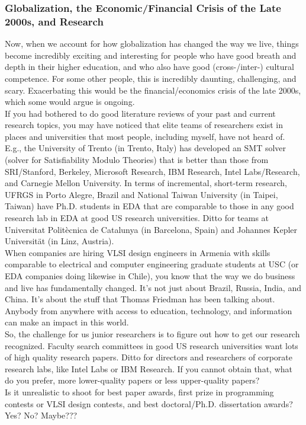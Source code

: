 \subsubsection{\hspace{0.1in} Globalization, the Economic/Financial Crisis of the Late 2000s, and Research}
\label{globalizationfinancialcrisis2008research}

Now, when we account for how globalization has changed the way we live, things become incredibly exciting and interesting for people who have good breath and depth in their higher education, and who also have good (cross-/inter-) cultural competence. For some other people, this is incredibly daunting, challenging, and scary. Exacerbating this would be the financial/economics crisis of the late 2000s, which some would argue is ongoing. \\

If you had bothered to do good literature reviews of your past and current research topics, you may have noticed that elite teams of researchers exist in places and universities that most people, including myself, have not heard of. E.g., the University of Trento (in Trento, Italy) has developed an SMT solver (solver for Satisfiability Modulo Theories) that is better than those from SRI/Stanford, Berkeley, Microsoft Research, IBM Research, Intel Labs/Research, and Carnegie Mellon University. In terms of incremental, short-term research, UFRGS in Porto Alegre, Brazil and National Taiwan University (in Taipei, Taiwan) have Ph.D. students in EDA that are comparable to those in any good research lab in EDA at good US research universities. Ditto for teams at Universitat Polit{\`{e}}cnica de Catalunya (in Barcelona, Spain) and Johannes Kepler Universit{\"{a}}t (in Linz, Austria). \\

When companies are hiring VLSI design engineers in Armenia with skills comparable to electrical and computer engineering graduate students at USC (or EDA companies doing likewise in Chile), you know that the way we do business and live has fundamentally changed. It's not just about Brazil, Russia, India, and China. It's about the stuff that Thomas Friedman has been talking about. Anybody from anywhere with access to education, technology, and information can make an impact in this world. \\

So, the challenge for us junior researchers is to figure out how to get our research recognized. Faculty search committees in good US research universities want lots of high quality research papers. Ditto for directors and researchers of corporate research labs, like Intel Labs or IBM Research. If you cannot obtain that, what do you prefer, more lower-quality papers or less upper-quality papers? \\
 
Is it unrealistic to shoot for best paper awards, first prize in programming contests or VLSI design contests, and best doctoral/Ph.D. dissertation awards? Yes? No? Maybe???